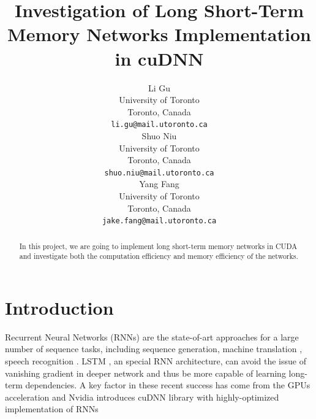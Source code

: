 \documentclass{article}
\title{Investigation of Long Short-Term Memory Networks Implementation in cuDNN}
\author{
  Li Gu \\
  University of Toronto \\
  Toronto, Canada \\
  \texttt{li.gu@mail.utoronto.ca} \\
  \And
  Shuo Niu \\
  University of Toronto \\
  Toronto, Canada \\
  \texttt{shuo.niu@mail.utoronto.ca} \\
  \And
  Yang Fang \\
  University of Toronto \\
  Toronto, Canada \\
  \texttt{jake.fang@mail.utoronto.ca} \\
}
\begin{document}

\maketitle
\begin{abstract}
  In this project, we are going to implement long short-term memory networks in CUDA 
  and investigate both the computation efficiency and memory efficiency of the networks.
\end{abstract}

\section{Introduction}







Recurrent Neural Networks (RNNs) are the state-of-art approaches for a large number of sequence tasks, including sequence generation\cite{eck2002first,sutskever2014sequence,gravessupervised}, machine translation \cite{cho2014learning,jean2015montreal,luong2015effective}, speech recognition \cite{graves2013speech}. LSTM \cite{hochreiter1997long}, an special RNN architecture, can avoid the issue of vanishing gradient \cite{pascanu2013difficulty} in deeper network and thus be more capable of learning long-term dependencies. A key factor in these recent success has come from the GPUs acceleration \cite{leonard2015rnn,weninger2015introducing} and Nvidia introduces cuDNN library\cite{chetlur2014cudnn} with highly-optimized implementation of RNNs\cite{appleyard2016optimizing} 
\end{document}
